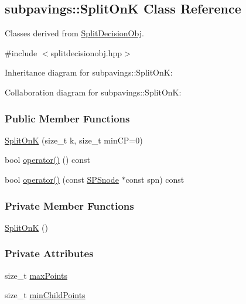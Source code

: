 \hypertarget{classsubpavings_1_1SplitOnK}{\subsection{subpavings\-:\-:\-Split\-On\-K \-Class \-Reference}
\label{classsubpavings_1_1SplitOnK}
}


\-Classes derived from \hyperlink{classsubpavings_1_1SplitDecisionObj}{\-Split\-Decision\-Obj}.  




{\ttfamily \#include $<$splitdecisionobj.\-hpp$>$}



\-Inheritance diagram for subpavings\-:\-:\-Split\-On\-K\-:


\-Collaboration diagram for subpavings\-:\-:\-Split\-On\-K\-:
\subsubsection*{\-Public \-Member \-Functions}
\begin{DoxyCompactItemize}
\item 
\hyperlink{classsubpavings_1_1SplitOnK_a1c66caafc36078d8e4049564d75b61de}{\-Split\-On\-K} (size\-\_\-t k, size\-\_\-t min\-C\-P=0)
\item 
bool \hyperlink{classsubpavings_1_1SplitOnK_a5e716ff213abc4d8864153ab5ec872a5}{operator()} () const 
\item 
bool \hyperlink{classsubpavings_1_1SplitOnK_a9ffd1c8f5536bfbeb9465e317bbf18ad}{operator()} (const \hyperlink{classsubpavings_1_1SPSnode}{\-S\-P\-Snode} $\ast$const spn) const 
\end{DoxyCompactItemize}
\subsubsection*{\-Private \-Member \-Functions}
\begin{DoxyCompactItemize}
\item 
\hyperlink{classsubpavings_1_1SplitOnK_aeda48e74521a54b6f83162e3ae6de0e8}{\-Split\-On\-K} ()
\end{DoxyCompactItemize}
\subsubsection*{\-Private \-Attributes}
\begin{DoxyCompactItemize}
\item 
size\-\_\-t \hyperlink{classsubpavings_1_1SplitOnK_a533786f57332f2559181036557cce420}{max\-Points}
\item 
size\-\_\-t \hyperlink{classsubpavings_1_1SplitOnK_a98bdd69177334492bf80b2ba32d41123}{min\-Child\-Points}
\end{DoxyCompactItemize}


